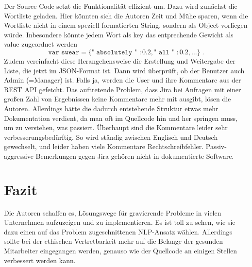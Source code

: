 \documentclass[oneside,12pt,a4paper,fleqn]{article}
\begin{document}
Der Source Code setzt die Funktionalität effizient um. Dazu wird zunächst die Wortliste geladen. Hier könnten sich die Autoren Zeit und Mühe sparen, wenn die Wortliste nicht in einem speziell formatierten String, sondern als Object vorliegen würde. Inbesondere könnte jedem Wort als key das entprechende Gewicht als value zugeordnet werden
$$\texttt{var swear}=\lbrace \texttt{"\ absolutely "\ } :0.2, \texttt{"\ all "\ } :0.2, \dots\rbrace\;.$$
Zudem vereinfacht diese Herangehensweise die Erstellung und Weitergabe der Liste, die jetzt im JSON-Format ist. Dann wird überprüft, ob der Benutzer auch Admin (=Manager) ist. Falls ja, werden die User und ihre Kommentare aus der REST API gefetcht. Das auftretende Problem, dass Jira bei Anfragen mit einer großen Zahl von Ergebnissen keine Kommentare mehr mit ausgibt, lösen die Autoren. Allerdings hätte die dadurch entstehende Struktur etwas mehr Dokumentation verdient, da man oft im Quellcode hin und her springen muss, um zu verstehen, was passiert. Überhaupt sind die Kommentare leider sehr verbesserungsbedürftig. So wird ständig zwischen Englisch und Deutsch gewechselt, und leider haben viele Kommentare Rechtschreibfehler. Passiv-aggressive Bemerkungen gegen Jira gehören nicht in dokumentierte Software.

\section{Fazit}
Die Autoren schaffen es, Lösungswege für gravierende Probleme in vielen Unternehmen aufzuzeigen und zu implementieren. Es ist toll zu sehen, wie sie dazu einen auf das Problem zugeschnittenen NLP-Ansatz wählen. Allerdings sollte bei der ethischen Vertretbarkeit mehr auf die Belange der gesunden Mitarbeiter eingegangen werden, genauso wie der Quellcode an einigen Stellen verbessert werden kann.
\end{document}
